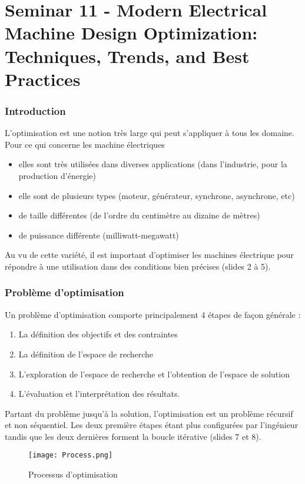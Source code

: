 \part{Seminar 11 - Modern Electrical Machine Design Optimization:
Techniques, Trends, and Best Practices}


\section{Introduction}
L'optimisation est une notion très large qui peut s'appliquer à tous les domaine. Pour ce qui concerne les machine électriques
\begin{itemize}
    \item elles sont très utilisées dans diverses applications (dans l'industrie, pour la production d'énergie)
    \item elle sont de plusieurs types (moteur, générateur, synchrone, asynchrone, etc)
    \item de taille différentes (de l'ordre du centimètre au dizaine de mètres)
    \item de puissance différente (milliwatt-megawatt)
\end{itemize}
Au vu de cette variété, il est important d'optimiser les machines électrique pour répondre à une utilisation dans des conditions bien précises (slides 2 à 5).
\section{Problème d'optimisation}
Un problème d'optimisation comporte principalement 4 étapes de façon générale : 
\begin{enumerate}
    \item La définition des objectifs et des contraintes
    \item La définition de l'espace de recherche
    \item L'exploration de l'espace de recherche et l'obtention de l'espace de solution
    \item L'évaluation et l'interprétation des résultats.
\end{enumerate}

Partant du problème jusqu'à la solution, l'optimisation est un problème récursif et non séquentiel. Les deux première étapes étant plus configurées par l'ingénieur tandis que les deux dernières forment la boucle itérative (slides 7 et 8).
\begin{figure}[H]
    \centering
    \texttt{[image: Process.png]}
    \caption{Processus d'optimisation}
    \label{fig:Optimisation}
\end{figure}
